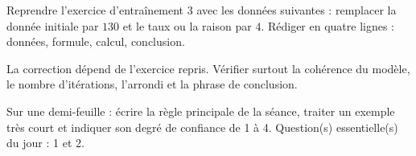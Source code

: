 
\begin{homework}Reprendre l'exercice d'entraînement 3 avec les données suivantes : remplacer la donnée initiale par $130$ et le taux ou la raison par $4$. Rédiger en quatre lignes : données, formule, calcul, conclusion.\end{homework}
\begin{solution}La correction dépend de l'exercice repris. Vérifier surtout la cohérence du modèle, le nombre d'itérations, l'arrondi et la phrase de conclusion.\end{solution}

\begin{exitticket}[3 minutes]Sur une demi-feuille : écrire la règle principale de la séance, traiter un exemple très court et indiquer son degré de confiance de 1 à 4. Question(s) essentielle(s) du jour : 1 et 2.\end{exitticket}

